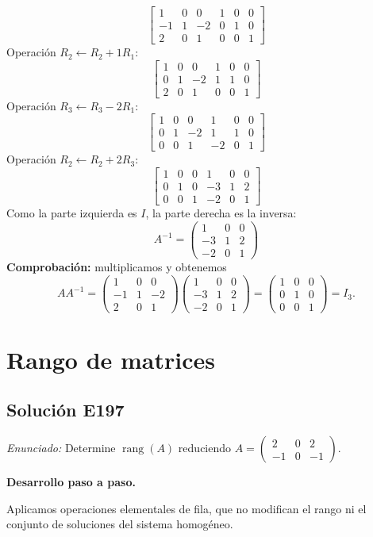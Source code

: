 \documentclass[12pt]{article}
\theoremstyle{remark}
\newcommand{\rang}{\operatorname{rang}}
\newcommand{\solucion}[2]{\Needspace{11\baselineskip}\subsection*{Solución E#1}\noindent\textit{Enunciado:} #2\par\medskip\noindent\textbf{Desarrollo paso a paso.}\par\medskip}
\begin{document}
\[
\left[\begin{array}{rrr|rrr}1&0&0&1&0&0\\-1&1&-2&0&1&0\\2&0&1&0&0&1\end{array}\right]
\]
Operación $R_{2}\leftarrow R_{2}+1R_{1}$:
\[
\left[\begin{array}{rrr|rrr}1&0&0&1&0&0\\0&1&-2&1&1&0\\2&0&1&0&0&1\end{array}\right]
\]
Operación $R_{3}\leftarrow R_{3}-2R_{1}$:
\[
\left[\begin{array}{rrr|rrr}1&0&0&1&0&0\\0&1&-2&1&1&0\\0&0&1&-2&0&1\end{array}\right]
\]
Operación $R_{2}\leftarrow R_{2}+2R_{3}$:
\[
\left[\begin{array}{rrr|rrr}1&0&0&1&0&0\\0&1&0&-3&1&2\\0&0&1&-2&0&1\end{array}\right]
\]
Como la parte izquierda es $I$, la parte derecha es la inversa:
\[
\boxed{A^{-1}=\begin{pmatrix}1&0&0\\-3&1&2\\-2&0&1\end{pmatrix}}
\]
\textbf{Comprobación:} multiplicamos y obtenemos
\[
AA^{-1}=\begin{pmatrix}1&0&0\\-1&1&-2\\2&0&1\end{pmatrix}\begin{pmatrix}1&0&0\\-3&1&2\\-2&0&1\end{pmatrix}=\begin{pmatrix}1&0&0\\0&1&0\\0&0&1\end{pmatrix}=I_{3}.
\]

\medskip

\section{Rango de matrices}

\solucion{197}{Determine $\rang(A)$ reduciendo $A=\begin{pmatrix}2&0&2\\-1&0&-1\end{pmatrix}$.}
Aplicamos operaciones elementales de fila, que no modifican el rango ni el conjunto de soluciones del sistema homogéneo.
\end{document}
